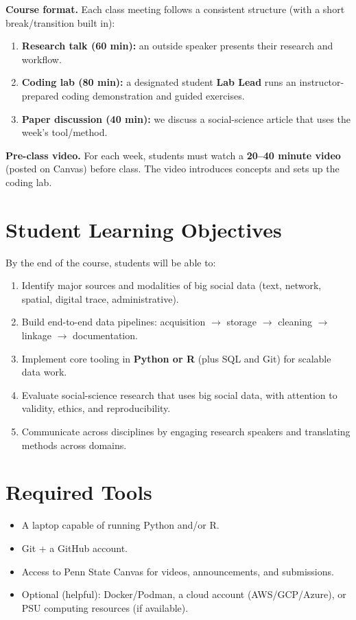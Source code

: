 \documentclass[letterpaper,11pt]{article}
\newcommand{\compresslist}{
\setlength{\itemsep}{1pt}
\setlength{\parskip}{0pt}
\setlength{\parsep}{0pt}
}
\begin{document}
\medskip
\noindent \textbf{Course format.} Each class meeting follows a consistent structure (with a short break/transition built in):
\begin{enumerate}
\compresslist
\item \textbf{Research talk (60 min):} an outside speaker presents their research and workflow.
\item \textbf{Coding lab (80 min):} a designated student \textbf{Lab Lead} runs an instructor-prepared coding demonstration and guided exercises.
\item \textbf{Paper discussion (40 min):} we discuss a social-science article that uses the week's tool/method.
\end{enumerate}

\noindent \textbf{Pre-class video.} For each week, students must watch a \textbf{20--40 minute video} (posted on Canvas) before class. The video introduces concepts and sets up the coding lab.

\section*{Student Learning Objectives}
By the end of the course, students will be able to:
\begin{enumerate}
\item Identify major sources and modalities of big social data (text, network, spatial, digital trace, administrative).
\item Build end-to-end data pipelines: acquisition $\rightarrow$ storage $\rightarrow$ cleaning $\rightarrow$ linkage $\rightarrow$ documentation.
\item Implement core tooling in \textbf{Python or R} (plus SQL and Git) for scalable data work.
\item Evaluate social-science research that uses big social data, with attention to validity, ethics, and reproducibility.
\item Communicate across disciplines by engaging research speakers and translating methods across domains.
\end{enumerate}

\section*{Required Tools}
\begin{itemize}
\compresslist
\item A laptop capable of running Python and/or R.
\item Git + a GitHub account.
\item Access to Penn State Canvas for videos, announcements, and submissions.
\item Optional (helpful): Docker/Podman, a cloud account (AWS/GCP/Azure), or PSU computing resources (if available).
\end{itemize}
\end{document}
